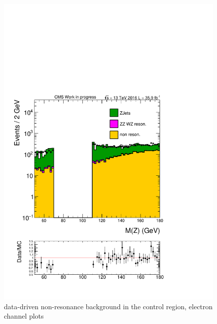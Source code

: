 \begin{figure}[htbp]
\begin{center}
\includegraphics[width=0.39\linewidth, page=4]{figures/test_metzpt50_RhoWt_puWeight68075_metfilter_el_.pdf}
\caption{data-driven non-resonance background in the control region, electron channel plots}
\label{fig:nonreselcr}
\end{center}
\end{figure}

